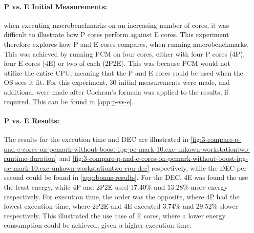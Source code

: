 

\paragraph{P vs. E Initial Measurements:} when executing macrobenchmarks on an increasing number of cores, it was difficult to illustrate how P cores perform against E cores. This experiment therefore explores how P and E cores compares, when running macrobenchmarks. This was achieved by running PCM on four cores, either with four P cores (4P), four E cores (4E) or two of each (2P2E). This was because PCM would not utilize the entire CPU, meaning that the P and E cores could be used when the OS sees it fit. For this experiment, $30$ initial measurements were made, and additional were made after Cochran's formula was applied to the results, if required. This can be found in \cref{app:p-vs-e}.



\paragraph{P vs. E Results:} The results for the execution time and DEC are illustrated in \cref{fig:3-compare-p-and-e-cores-on-pcmark-without-boost-ipg-pc-mark-10.exe-unkown-workstationtwo-runtime-duration} and  \cref{fig:3-compare-p-and-e-cores-on-pcmark-without-boost-ipg-pc-mark-10.exe-unkown-workstationtwo-cpu-dec} respectively, while the DEC per second could be found in \cref{app:bonus-results}. For the DEC, 4E was found the use the least energy, while 4P and 2P2E used $17.40\%$ and $13.28\%$ more energy respectively. For execution time, the order was the opposite, where 4P had the lowest execution time, where 2P2E and 4E executed $3.74\%$ and $29.52\%$ slower respectively. This illustrated the use case of E cores, where a lower energy consumption could be achieved, given a higher execution time.  




